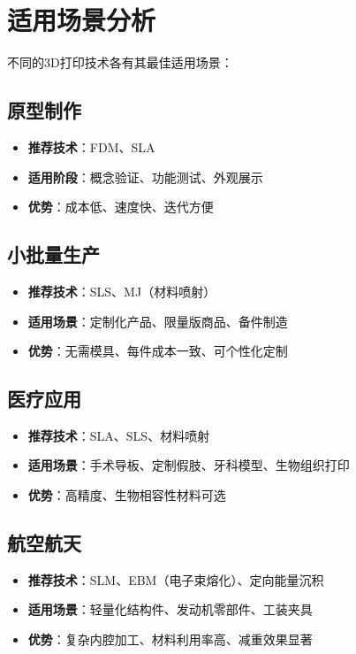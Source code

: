 \documentclass[12pt,UTF8]{ctexbook}
\begin{document}
\section{适用场景分析}

不同的3D打印技术各有其最佳适用场景：

\subsection{原型制作}
\begin{itemize}
\item \textbf{推荐技术}：FDM、SLA
\item \textbf{适用阶段}：概念验证、功能测试、外观展示
\item \textbf{优势}：成本低、速度快、迭代方便
\end{itemize}

\subsection{小批量生产}
\begin{itemize}
\item \textbf{推荐技术}：SLS、MJ（材料喷射）
\item \textbf{适用场景}：定制化产品、限量版商品、备件制造
\item \textbf{优势}：无需模具、每件成本一致、可个性化定制
\end{itemize}

\subsection{医疗应用}
\begin{itemize}
\item \textbf{推荐技术}：SLA、SLS、材料喷射
\item \textbf{适用场景}：手术导板、定制假肢、牙科模型、生物组织打印
\item \textbf{优势}：高精度、生物相容性材料可选
\end{itemize}

\subsection{航空航天}
\begin{itemize}
\item \textbf{推荐技术}：SLM、EBM（电子束熔化）、定向能量沉积
\item \textbf{适用场景}：轻量化结构件、发动机零部件、工装夹具
\item \textbf{优势}：复杂内腔加工、材料利用率高、减重效果显著
\end{itemize}
\end{document}

